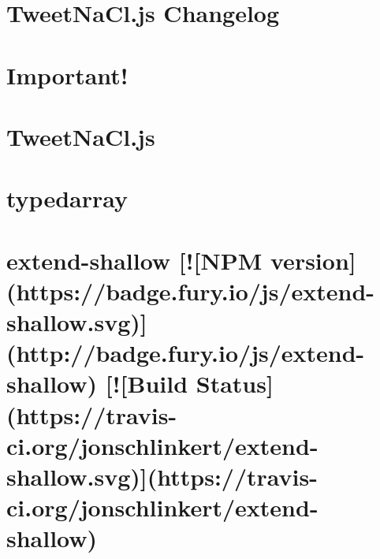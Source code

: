 \documentclass[twoside]{book}
\newcommand{\+}{\discretionary{\mbox{\scriptsize$\hookleftarrow$}}{}{}}
\begin{document}
\chapter{Tweet\+Na\+Cl.\+js Changelog}
\label{md_dsmacc_vis_degree_node_modules_tweetnacl_CHANGELOG}

\chapter{Important!}
\label{md_dsmacc_vis_degree_node_modules_tweetnacl_PULL_REQUEST_TEMPLATE}

\chapter{Tweet\+Na\+Cl.\+js}
\label{md_dsmacc_vis_degree_node_modules_tweetnacl_README}

\chapter{typedarray}
\label{md_dsmacc_vis_degree_node_modules_typedarray_readme}

\chapter{extend-\/shallow \mbox{[}!\mbox{[}N\+PM version\mbox{]}(https\+://badge.fury.\+io/js/extend-\/shallow.svg)\mbox{]}(http\+://badge.fury.\+io/js/extend-\/shallow) \mbox{[}!\mbox{[}Build Status\mbox{]}(https\+://travis-\/ci.org/jonschlinkert/extend-\/shallow.svg)\mbox{]}(https\+://travis-\/ci.org/jonschlinkert/extend-\/shallow)}
\label{md_dsmacc_vis_degree_node_modules_union-value_node_modules_extend-shallow_README}

\end{document}
